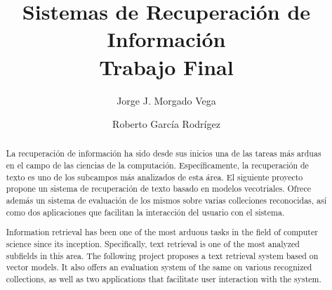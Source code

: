 \documentclass{llncs}
\begin{document}
\frontmatter
\pagestyle{headings}  %

\mainmatter              %
%
\title{Sistemas de Recuperación de Información\\ Trabajo Final}
%
%
\author{Jorge J. Morgado Vega \and Roberto García Rodrígez}
%
%
%

\maketitle              %

\renewcommand\abstractname{Resúmen.}
\renewcommand\keywordname{{\bf Palabras Claves:}}
\begin{abstract}
	La recuperación de información ha sido desde sus inicios una de las tareas
	más arduas en el campo de las ciencias de la computación. Específicamente,
	la recuperación de texto es uno de los subcampos más analizados de esta área.
	El siguiente proyecto propone un sistema de recuperación de texto basado
	en modelos vecotriales. Ofrece además un sistema de evaluación de los mismos
	sobre varias colleciones reconocidas, así como dos aplicaciones que facilitan
	la interacción del usuario con el sistema.
\end{abstract}
\renewcommand\abstractname{Abstract.}
\renewcommand\keywordname{{\bf Keywords:}}
\begin{abstract}
	Information retrieval has been one of the most arduous tasks in the field
	of computer science since its inception. Specifically, text retrieval is
	one of the most analyzed subfields in this area. The following project
	proposes a text retrieval system based on vector models. It also offers an
	evaluation system of the same on various recognized collections, as well as
	two applications that facilitate user interaction with the system.
\end{abstract}
%
\end{document}
